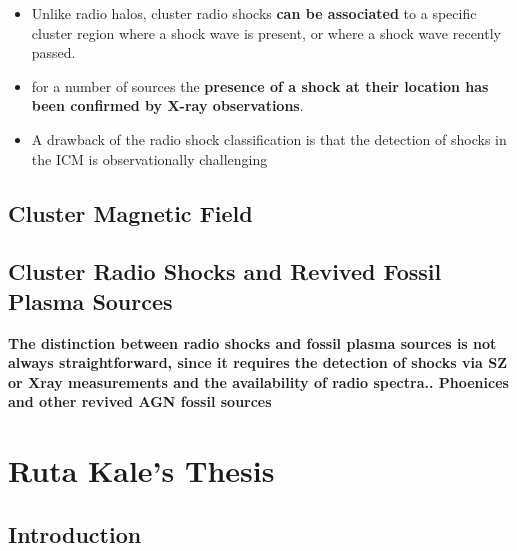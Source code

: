 \documentclass[12pt]{report}
\newcommand{\tbf}[1]{\textbf{#1}}
\begin{document}
\begin{itemize}
\begin{itemize}
 \item  Unlike radio halos, cluster radio shocks \tbf{can be associated} to a specific cluster region where a shock wave is present, or where a shock wave recently passed.
 \item for a number of sources the \tbf{presence of a shock at their location has been confirmed by X-ray observations}.
 \item  A drawback of the radio shock classification is that the detection of shocks in the ICM is observationally challenging
 \end{itemize}
 
 \end{itemize}
 \section{Cluster Magnetic Field}
 \section{Cluster Radio Shocks and Revived Fossil Plasma Sources}
 \textbf{The distinction between radio shocks and fossil plasma sources is not always straightforward, since it requires the detection of shocks via SZ or Xray measurements and the availability of radio spectra.. Phoenices and other revived AGN fossil sources  }

\chapter{Ruta Kale's Thesis}
\section{Introduction}
\end{document}
